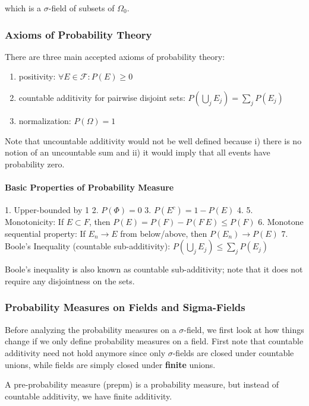\documentclass{article}
\theoremstyle{proposition}
\begin{document}
		which is a $\sigma$-field of subsets of $\Omega_0$. 

		\subsubsection{Axioms of Probability Theory}
			There are three main accepted axioms of probability theory:

			\begin{enumerate}
				\item positivity: $\forall E \in \mathcal{F}: P(E) \ge 0$
				\item countable additivity for pairwise disjoint sets: $P(\bigcup_j E_j) = \sum_j P(E_j)$
				\item normalization: $P(\Omega) = 1$
			\end{enumerate}

			Note that uncountable additivity would not be well defined because i) there is no notion of an uncountable sum and ii) it would imply that all events have probability zero.

			\paragraph{Basic Properties of Probability Measure}

				1. Upper-bounded by 1
				2. $P(\Phi) = 0$
				3. $P(E^c) = 1 - P(E)$
				4. 
				5. Monotonicity: If $E \subset F$, then $P(E) = P(F) - P(F\ E) \le P(F)$
				6. Monotone sequential property: If $E_n \rightarrow E$ from below/above, then $P(E_n) \rightarrow P(E)$ 
				7. Boole's Inequality (countable sub-additivity): $P(\bigcup_j E_j) \le \sum_j P(E_j)$

			Boole's inequality is also known as countable sub-additivity; note that it does not require any disjointness on the sets.

		\subsubsection{Probability Measures on Fields and Sigma-Fields}
			Before analyzing the probability measures on a $\sigma$-field, we first look at how things change if we only define probability measures on a field. First note that countable additivity need not hold anymore since only $\sigma$-fields are closed under countable unions, while fields are simply closed under \textbf{finite} unions.

			\begin{definition}
				A pre-probability measure (prepm) is a probability measure, but instead of countable additivity, we have finite additivity.
			\end{definition}
\end{document}
